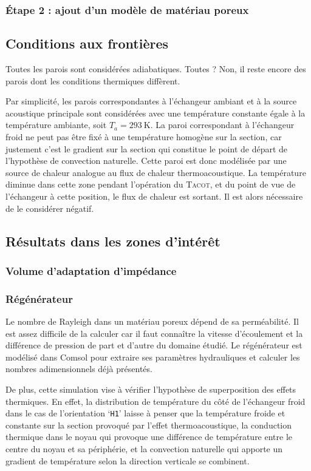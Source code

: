 \subsubsection{\'Etape 2 : ajout d'un modèle de matériau poreux}


\subsection{Conditions aux frontières}
Toutes les parois sont considérées adiabatiques. Toutes ? Non, il reste encore des parois dont les conditions thermiques diffèrent. 

Par simplicité, les parois correspondantes à l'échangeur ambiant et à la source acoustique principale sont considérées avec une température constante égale à la température ambiante, soit $T_a=\qty{293}{\kelvin}$. La paroi correspondant à l'échangeur froid ne peut pas être fixé à une température homogène sur la section, car justement c'est le gradient sur la section qui constitue le point de départ de l'hypothèse de convection naturelle. Cette paroi est donc modélisée par une source de chaleur analogue au flux de chaleur thermoacoustique. La température diminue dans cette zone pendant l'opération du \textsc{Tacot}, et du point de vue de l'échangeur à cette position, le flux de chaleur est sortant. Il est alors nécessaire de le considérer négatif.

\subsection{Résultats dans les zones d'intérêt}
\subsubsection{Volume d'adaptation d'impédance}

\subsubsection{Régénérateur}
Le nombre de Rayleigh dans un matériau poreux dépend de sa perméabilité. Il est assez difficile de la calculer car il faut connaître la vitesse d'écoulement et la différence de pression de part et d'autre du domaine étudié. Le régénérateur est modélisé dans Comsol pour extraire ses paramètres hydrauliques et calculer les nombres adimensionnels déjà présentés.

De plus, cette simulation vise à vérifier l'hypothèse de superposition des effets thermiques. En effet, la distribution de température du côté de l'échangeur froid dans le cas de l'orientation `\texttt{H1}' laisse à penser que la température froide et constante sur la section provoqué par l'effet thermoacoustique, la conduction thermique dans le noyau qui provoque une différence de température entre le centre du noyau et sa périphérie, et la convection naturelle qui apporte un gradient de température selon la direction verticale se combinent.

